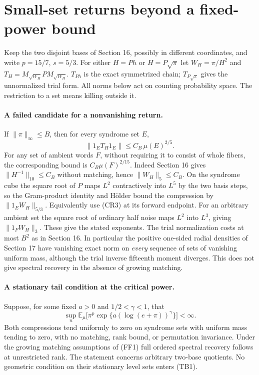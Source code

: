 \section{Small-set returns beyond a fixed-power bound}
\label{sec:tail-compression}
Keep the two disjoint bases of Section 16, possibly in different coordinates,
and write $p=15/7$, $s=5/3$. For either $H=Ph$ or $H=P\sqrt\pi$ let
$W_H=\pi/H^2$ and $T_H=M_{\sqrt{W_H}}P M_{\sqrt{W_H}}$.
$T_{Ph}$ is the exact symmetrized chain;
$T_{P\sqrt\pi}$ gives the unnormalized trial form. All norms below act on
counting probability space. The restriction to a set means killing outside it.

\paragraph{A failed candidate for a nonvanishing return.}
If $\|\pi\|_\infty\le B$, then for every syndrome set $E$,
\[
 \|1_E T_H1_E\|\le C_B\,\mu(E)^{2/5}.
\]
For any set of ambient words $F$, without requiring it to consist of
whole fibers, the corresponding bound is $C_B\mu(F)^{2/15}$.
Indeed Section 16 gives $\|H^{-1}\|_{10}\le C_B$ without matching,
hence $\|W_H\|_5\le C_B$. On the syndrome cube the square root of $P$
maps $L^2$ contractively into $L^5$ by the two basis steps, so the
Gram-product identity and H\"older bound the compression by
$\|1_E W_H\|_{5/3}$. Equivalently use (CR3) at its forward endpoint.
For an arbitrary ambient set the square root of ordinary half noise
maps $L^2$ into $L^3$, giving $\|1_F W_H\|_3$.
These give the stated exponents. The trial normalization costs at most $B^2$
as in Section 16. In particular the positive one-sided radial densities
of Section 17 have vanishing exact norm on \emph{every} sequence of
sets of vanishing uniform mass, although the trial inverse fifteenth
moment diverges. This does not give spectral recovery in the absence
of growing matching.

\paragraph{A stationary tail condition at the critical power.}
Suppose, for some fixed $a>0$ and $1/2<\gamma<1$, that
\[
 \sup_n \mathbb E_\mu \big[\pi^p
   \exp\{a(\log(e+\pi))^\gamma\}\big]<\infty .                 \tag{TB1}
\]
Both compressions tend uniformly to zero on syndrome sets with uniform
mass tending to zero, with no matching, rank bound, or permutation
invariance. Under the growing matching assumptions of (FF1) full
ordered spectral recovery follows at unrestricted rank.
The statement concerns arbitrary two-base quotients. No geometric
condition on their stationary level sets enters (TB1).

